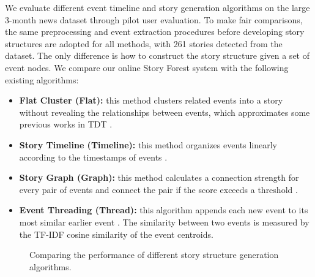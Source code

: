 We evaluate different event timeline and story generation algorithms on the large 3-month news dataset through pilot user evaluation. To make fair comparisons, the same preprocessing and event extraction procedures before developing story structures are adopted for all methods, with 261 stories detected from the dataset.
The only difference is how to construct the story structure given a set of event nodes.
We compare our online Story Forest system with the following existing algorithms:
\begin{itemize}
	\item \textbf{Flat Cluster (Flat):} this method clusters related events into a story without revealing the relationships between events, which approximates some previous works in TDT \cite{yang2002multi, allan1998line}.
	\item \textbf{Story Timeline (Timeline):} this method organizes events linearly according to the timestamps of events \cite{sayyadi2009event,sayyadi2013graph}.
	\item \textbf{Story Graph (Graph):} this method calculates a connection strength for every pair of events and connect the pair if the score exceeds a threshold \cite{yang2009discovering}.
	\item \textbf{Event Threading (Thread):} this algorithm appends each new event to its most similar earlier event \cite{nallapati2004event}. The similarity between two events is measured by the TF-IDF cosine similarity of the event centroids.
\end{itemize}

\begin{figure*}[t]
                        \centering
                \hspace{-3mm}
                        \hspace{-3mm}
                        \vspace{-3mm}
                \caption{Comparing the performance of different story structure generation algorithms.}
                \label{fig:compareAlgs}
\vspace{-4mm}
\end{figure*}



